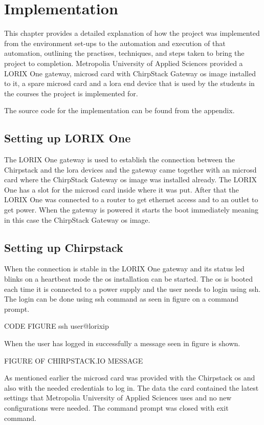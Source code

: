 
\chapter{Implementation} \label{ch:impl}
This chapter provides a detailed explanation of how the project was implemented from the environment set-ups to the automation and execution of that automation, outlining the practises, techniques, and steps taken to bring the project to completion.
Metropolia University of Applied Sciences provided a LORIX One gateway, micro\gls{sd} card with ChirpStack Gateway \gls{os} image installed to it, a spare micro\gls{sd} card and a \gls{lora} end device that is used by the students in the courses the project is implemented for.

The source code for the implementation can be found from the appendix.

\section{Setting up LORIX One}
The LORIX One gateway is used to establish the connection between the Chirpstack and the \gls{lora} devices and the gateway came together with an micro\gls{sd} card where the ChirpStack Gateway \gls{os} image was installed already.
The LORIX One has a slot for the micro\gls{sd} card inside where it was put.
After that the LORIX One was connected to a router to get ethernet access and to an outlet to get power.
When the gateway is powered it starts the boot immediately meaning in this case the ChirpStack Gateway \gls{os} image.

\section{Setting up Chirpstack}
When the connection is stable in the LORIX One gateway and its status led blinks on a heartbeat mode the \gls{os} installation can be started.
The \gls{os} is booted each time it is connected to a power supply and the user needs to login using \gls{ssh}.
The login can be done using ssh command as seen in figure on a command prompt.

CODE FIGURE ssh user@lorixip

When the user has logged in successfully a message seen in figure is shown.

FIGURE OF CHIRPSTACK.IO MESSAGE

As mentioned earlier the micro\gls{sd} card was provided with the Chirpstack \gls{os} and also with the needed credentials to log in.
The data the card contained the latest settings that Metropolia University of Applied Sciences uses and no new configurations were needed.
The command prompt was closed with exit command.




